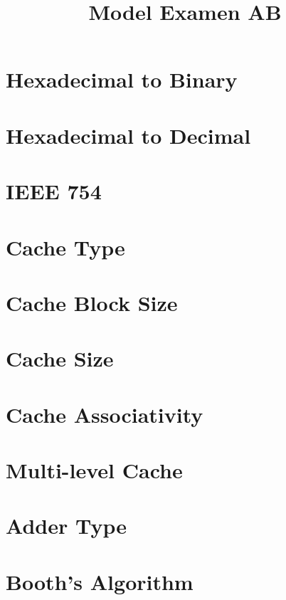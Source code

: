 \documentclass[a4paper,12pt]{article}
\title{Model Examen AB}
\date{}
\begin{document}
\maketitle

\section{Hexadecimal to Binary}


\section{Hexadecimal to Decimal}


\section{IEEE 754}


\section{Cache Type}


\section{Cache Block Size}


\section{Cache Size}


\section{Cache Associativity}


\section{Multi-level Cache}


\section{Adder Type}


\section{Booth's Algorithm}

\end{document}
